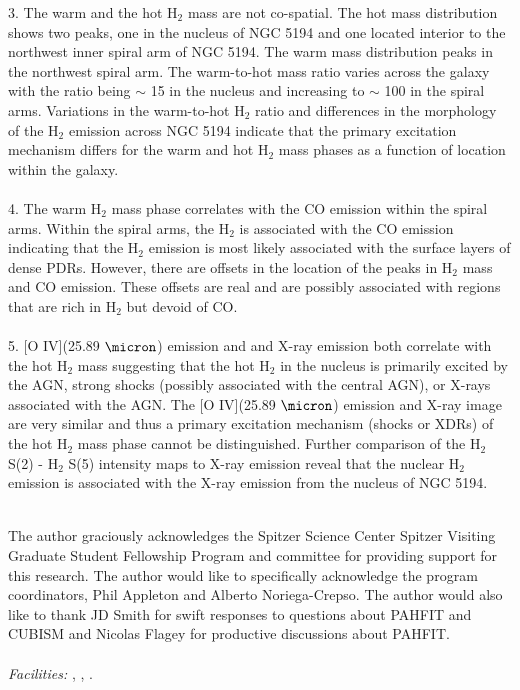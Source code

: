 \documentclass[manuscript]{aastex}
\begin{document}
3.  The warm and the hot $\mathrm{H_2}$ mass are not co-spatial.  The hot mass distribution shows two peaks, one in the nucleus of NGC 5194 and one located interior to the northwest inner spiral arm of NGC 5194.  The warm mass distribution peaks in the northwest spiral arm.  The warm-to-hot mass ratio varies across the galaxy with the ratio being $\sim$ 15 in the nucleus and increasing to $\sim$ 100 in the spiral arms.  Variations in the warm-to-hot $\mathrm{H_2}$ ratio and differences in the morphology of the $\mathrm{H_2}$ emission across NGC 5194 indicate that the primary excitation mechanism differs for the warm and hot $\mathrm{H_2}$ mass phases as a function of location within the galaxy.\\
\\
4. The warm $\mathrm{H_2}$ mass phase correlates with the CO emission within the spiral arms.  Within the spiral arms, the $\mathrm{H_2}$ is associated with the CO emission indicating that the $\mathrm{H_2}$ emission is most likely associated with the surface layers of dense PDRs.  However, there are offsets in the location of the peaks in $\mathrm{H_2}$ mass and CO emission.  These offsets are real and are possibly associated with regions that are rich in $\mathrm{H_2}$ but devoid of CO.  \\
\\
5.  [O IV](25.89 $\micron$) emission and and X-ray emission both correlate with the hot $\mathrm{H_2}$ mass suggesting that the hot $\mathrm{H_2}$ in the nucleus is primarily excited by the AGN, strong shocks (possibly associated with the central AGN), or X-rays associated with the AGN.  The [O IV](25.89 $\micron$) emission and X-ray image are very similar and thus a primary excitation mechanism (shocks or XDRs) of the hot $\mathrm{H_2}$ mass phase cannot be distinguished.  Further comparison of the $\mathrm{H_2}$ S(2) - $\mathrm{H_2}$ S(5) intensity maps to X-ray emission reveal that the nuclear $\mathrm{H_2}$ emission is associated with the X-ray emission from the nucleus of NGC 5194.\\
\\

\acknowledgments

The author graciously acknowledges the Spitzer Science Center Spitzer Visiting Graduate Student Fellowship Program and committee for providing support for this research.  The author would like to specifically acknowledge the program coordinators, Phil Appleton and Alberto Noriega-Crepso.  The author would also like to thank JD Smith for swift responses to questions about PAHFIT and CUBISM and Nicolas Flagey for productive discussions about PAHFIT.\\
\\
{\it Facilities:} , , .
\end{document}
